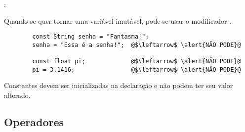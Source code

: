 \begin{frame}[fragile]{\insertsection: \insertsubsection}

	Quando se quer tornar uma variável imutável, pode-se usar o modificador \texttt{}.
	\begin{verbatim}
		const String senha = "Fantasma!";
		senha = "Essa é a senha!";  @$\leftarrow$ \alert{NÃO PODE}@

		const float pi;             @$\leftarrow$ \alert{NÃO PODE}@
		pi = 3.1416;                @$\leftarrow$ \alert{NÃO PODE}@
	\end{verbatim}

	Constantes devem ser inicializadas na declaração e não podem ter seu valor alterado.

\end{frame}


\subsection{Operadores}


